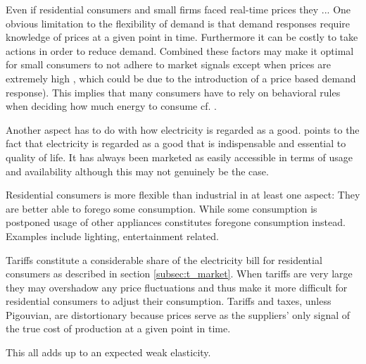 Even if residential consumers and small firms faced real-time prices they ...
One obvious limitation to the flexibility of demand is that demand responses require knowledge of prices at a given point in time. Furthermore it can be costly to take actions in order to reduce demand. Combined these factors may make it optimal for small consumers to not adhere to market signals except when prices are extremely high \citep{wolak2011residential}, which could be due to the introduction of a price based demand response). This implies that many consumers have to rely on behavioral rules when deciding how much energy to consume cf. \citet{kirscthen2003demand}.\par

 Another aspect has to do with how electricity is regarded as a good. \citet{kirschen2003demand} points to the fact that electricity is regarded as a good that is indispensable and essential to quality of life. It has always been marketed as easily accessible in terms of usage and availability although this may not genuinely be the case.
 \medskip

 Residential consumers is more flexible than industrial in at least one aspect: They are better able to forego some consumption. While some consumption is postponed usage of other appliances constitutes foregone consumption instead. Examples include lighting, entertainment related.

Tariffs constitute a considerable share of the electricity bill for residential consumers as described in section \ref{subsec:t_market}. When tariffs are very large they may overshadow any price fluctuations and thus make it more difficult for residential consumers to adjust their consumption. Tariffs and taxes, unless Pigouvian, are distortionary because prices serve as the suppliers' only signal of the true cost of production at a given point in time.

This all adds up to an expected weak elasticity.

